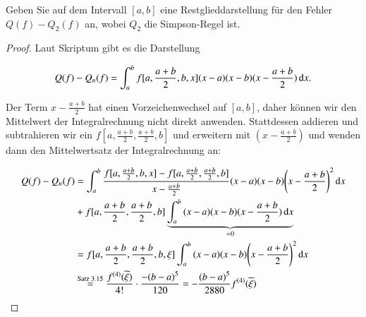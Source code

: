
\begin{exercise}
  Geben Sie auf dem Intervall $[a,b]$ eine Restglieddarstellung für den Fehler $Q(f)-Q_2(f)$ an, wobei $Q_2$ die Simpson-Regel ist.
\end{exercise}
\begin{proof}
  Laut Skriptum gibt es die Darstellung

  \begin{equation*}
    Q(f)-Q_n(f)=\int_a^b{f[a,\frac{a+b}{2},b,x](x-a)(x-b)(x-\frac{a+b}{2}) \dif x}.
  \end{equation*}

  Der Term $x-\frac{a+b}{2}$ hat einen Vorzeichenwechsel auf $[a,b]$, daher können wir den Mittelwert der Integralrechnung nicht direkt anwenden. Stattdessen addieren und subtrahieren wir ein $f[a,\frac{a+b}{2},\frac{a+b}{2},b]$ und erweitern mit $(x-\frac{a+b}{2})$ und wenden dann den Mittelwertsatz der Integralrechnung an:

  \begin{equation*}
    \begin{split}
      Q(f)-Q_n(f)
      &=\int_a^b{\frac{f[a,\frac{a+b}{2},b,x]-f[a,\frac{a+b}{2},\frac{a+b}{2},b]}{x-\frac{a+b}{2}}(x-a)(x-b){\left(x-\frac{a+b}{2}\right)}^2 \dif x} \\
      &+f[a,\frac{a+b}{2},\frac{a+b}{2},b]\underbrace{\int_a^b{(x-a)(x-b)(x-\frac{a+b}{2}) \dif x}}_{=0} \\
      &= f[a,\frac{a+b}{2},\frac{a+b}{2},b,\xi]\int_a^b{(x-a)(x-b){\left(x-\frac{a+b}{2}\right)}^2 \dif x} \\
      &\stackrel{\text{Satz 3.15}}{=} \frac{f^{(4)}(\widetilde{\xi})}{4!} \cdot \frac{-{(b-a)}^5}{120} = -\frac{{(b-a)}^5}{2880} f^{(4)}(\widetilde{\xi})
    \end{split}
  \end{equation*}
\end{proof}
